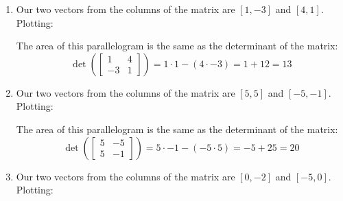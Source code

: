 \begin{Answer}[ref = geo_det]
\begin{enumerate}
    \item Our two vectors from the columns of the matrix are $\left[1, -3 
    \right]$ and $\left[4, 1 \right]$. Plotting:
    

    The area of this parallelogram is the same as the determinant of the matrix:
    $$\det\left( \begin{bmatrix}
        1 & 4\\
        -3 &1
    \end{bmatrix} \right) = 1 \cdot 1 - \left( 4 \cdot -3 \right) = 1 + 12 = 13$$

    \item Our two vectors from the columns of the matrix are $\left[5, 5 
    \right]$ and $\left[-5, -1 \right]$. Plotting:


    The area of this parallelogram is the same as the determinant of the 
    matrix:
    $$\det \left( \begin{bmatrix}
        5 & -5\\
        5 & -1
    \end{bmatrix} \right) = 5 \cdot -1 - \left( -5 \cdot 5 \right) = -5 + 25 = 
    20$$

    \item Our two vectors from the columns of the matrix are $\left[ 0, -2 
    \right]$ and $\left[ -5, 0 \right]$. Plotting:


\end{enumerate}
\end{Answer}
